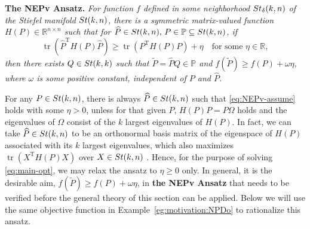\documentclass[11pt]{article}
\def\bbP{\mathbb{P}}
\def\bbR{\mathbb{R}}
\def\wtd{\widetilde}
\def\what{\widehat}
\newcommand\STM[2]{{\rm St}(#1,#2)}
\newcommand\STMnbr{{\rm St}_{\delta}(k,n)}
\DeclareMathOperator{\tr}{tr}
\DeclareMathOperator{\T}{T}
\theoremstyle{definition}
\numberwithin{equation}{section}
\begin{document}
\smallskip\noindent
{\bf The NEPv Ansatz.}
{\em
For function $f$ defined in some neighborhood $\STMnbr$ of the Stiefel manifold $\STM{k}{n}$,
there is a
symmetric matrix-valued function $H(P)\in\bbR^{n\times n}$ such that for
$\what P\in\STM{k}{n},\,P\in\bbP\subseteq\STM{k}{n}$,
if
\begin{equation}\label{eq:NEPv-assume}
\tr(\what P^{\T}H(P)\what P)\ge\tr(P^{\T}H(P)P)+\eta
\quad\mbox{for some $\eta\in\bbR$},
\end{equation}
then
there exists $Q\in\STM{k}{k}$ such that $\wtd P=\what PQ\in\bbP$ and
$f(\wtd P)\ge f(P)+\omega\eta$,
where $\omega$ is some positive constant, independent of $P$ and $\what P$.
}

\smallskip
For any $P\in\STM{k}{n}$, there is always
        $\what P\in\STM{k}{n}$ such that \eqref{eq:NEPv-assume} holds with some $\eta>0$, unless for that given $P$,
         $H(P)P=P\Omega$ holds and the eigenvalues of $\Omega$ consist of the $k$ largest eigenvalues of $H(P)$.
        In fact, we can take
        $\what P\in\STM{k}{n}$ to be an orthonormal basis matrix of the eigenspace of $H(P)$
        associated with its $k$ largest eigenvalues, which also maximizes
        $\tr(X^{\T}H(P)X)$ over $X\in\STM{k}{n}$ \cite{fan:1949}.
Hence, for the purpose of solving \eqref{eq:main-opt},
we may relax the ansatz to $\eta\ge 0$ only.
        In general, it is the desirable aim, $f(\wtd P)\ge f(P)+\omega\eta$, in {\bf the NEPv Ansatz}
        that needs to be verified before the general theory of this section can be applied.
Below we will use the same objective function in Example~\ref{eg:motivation:NPDo} to  rationalize this ansatz.
\end{document}

